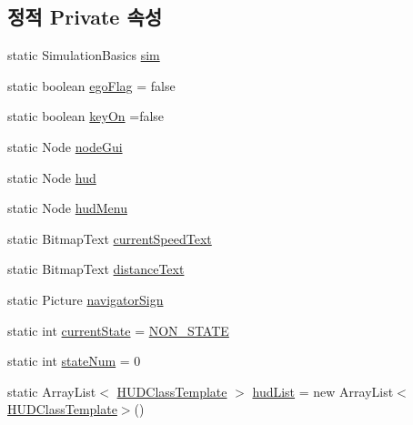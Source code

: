 \subsection*{정적 Private 속성}
\begin{DoxyCompactItemize}
\item 
static Simulation\+Basics \hyperlink{classkr_1_1ac_1_1kookmin_1_1cs_1_1hud_1_1_h_u_d_management_abcbcea66aba5169a6d07c407d1e3c86d}{sim}
\item 
static boolean \hyperlink{classkr_1_1ac_1_1kookmin_1_1cs_1_1hud_1_1_h_u_d_management_ae9746ce389f6ae79a1f245943631e8af}{ego\+Flag} = false
\item 
static boolean \hyperlink{classkr_1_1ac_1_1kookmin_1_1cs_1_1hud_1_1_h_u_d_management_ac411b7fde47d1bec2bd043b2f2df51e8}{key\+On} =false
\item 
static Node \hyperlink{classkr_1_1ac_1_1kookmin_1_1cs_1_1hud_1_1_h_u_d_management_af523238fd17953e526bc0d81a4057ebc}{node\+Gui}
\item 
static Node \hyperlink{classkr_1_1ac_1_1kookmin_1_1cs_1_1hud_1_1_h_u_d_management_a4c4a440b9bdbbe24eb50ee79826aee53}{hud}
\item 
static Node \hyperlink{classkr_1_1ac_1_1kookmin_1_1cs_1_1hud_1_1_h_u_d_management_a42b564e79a47075337594ae2a83f4309}{hud\+Menu}
\item 
static Bitmap\+Text \hyperlink{classkr_1_1ac_1_1kookmin_1_1cs_1_1hud_1_1_h_u_d_management_afd73165355cc807a706c8e5c29a3f271}{current\+Speed\+Text}
\item 
static Bitmap\+Text \hyperlink{classkr_1_1ac_1_1kookmin_1_1cs_1_1hud_1_1_h_u_d_management_a462366543dcc71453006bd2ded4e463a}{distance\+Text}
\item 
static Picture \hyperlink{classkr_1_1ac_1_1kookmin_1_1cs_1_1hud_1_1_h_u_d_management_a5a7a9b54b80a068feadce31902fca2ab}{navigator\+Sign}
\item 
static int \hyperlink{classkr_1_1ac_1_1kookmin_1_1cs_1_1hud_1_1_h_u_d_management_a6e135a288ebdc4381eb971ab03d0bd6e}{current\+State} = \hyperlink{classkr_1_1ac_1_1kookmin_1_1cs_1_1hud_1_1_h_u_d_management_aed0bc1b7b1fd78bb588e2321b44cb254}{N\+O\+N\+\_\+\+S\+T\+A\+T\+E}
\item 
static int \hyperlink{classkr_1_1ac_1_1kookmin_1_1cs_1_1hud_1_1_h_u_d_management_ac951218e3771940c9b4555f3ac830d7f}{state\+Num} = 0
\item 
static Array\+List$<$ \hyperlink{classkr_1_1ac_1_1kookmin_1_1cs_1_1hud_1_1_h_u_d_class_template}{H\+U\+D\+Class\+Template} $>$ \hyperlink{classkr_1_1ac_1_1kookmin_1_1cs_1_1hud_1_1_h_u_d_management_a9eec206ae0d3464de9e92243ae0aba24}{hud\+List} = new Array\+List$<$\hyperlink{classkr_1_1ac_1_1kookmin_1_1cs_1_1hud_1_1_h_u_d_class_template}{H\+U\+D\+Class\+Template}$>$()

\end{DoxyCompactItemize}
